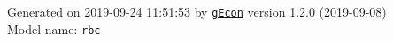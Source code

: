 \documentclass[10pt,a4paper]{article}
\numberwithin{equation}{section}
\begin{document}
\begin{flushleft}{\large
Generated  on 2019-09-24 11:51:53 by \href{http://gecon.r-forge.r-project.org/}{\texttt{gEcon}} version 1.2.0 (2019-09-08)\\
Model name: \verb+rbc+
}\end{flushleft}



\end{document}

